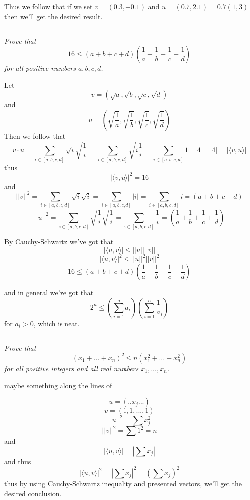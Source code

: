 \documentclass[11pt,oneside,titlepage]{book}
\begin{document}
Thus we follow that if we set $v = (0.3, -0.1)$
and $u = (0.7, 2.1) = 0.7(1, 3)$ then we'll
get the desired result.

\subsection{}

\textit{Prove that }
$$16 \leq (a + b + c + d)(\frac 1 a + \frac 1 b + \frac 1 c + \frac 1 d)$$
\textit{for all positive numbers $a, b, c, d$.}


Let
$$v = (\sqrt{a}, \sqrt{b}, \sqrt{c}, \sqrt{d})$$
and
$$u = \left(\sqrt{\frac 1 a}, \sqrt{\frac 1 b}, \sqrt{\frac 1 c}, \sqrt{\frac 1 d}\right)$$
Then we follow that
$$v \cdot u = \sum_{i \in [a, b, c, d]}{\sqrt{i} \sqrt{\frac{1}{i}}} =
\sum_{i \in [a, b, c, d]}{\sqrt{i \frac{1}{i}}} =
\sum_{i \in [a, b, c, d]}{1} = 4 = |4| = |\langle v,  u \rangle|$$
thus
$$|\langle v,  u \rangle|^2 = 16$$
and
$$||v||^2 = \sum_{i \in [a, b, c, d]}{\sqrt{i}\sqrt{i}} =
\sum_{i \in [a, b, c, d]}{|i|} = \sum_{i \in [a, b, c, d]}{i} = (a + b + c + d)$$
$$||u||^2 = \sum_{i \in [a, b, c, d]}{\sqrt{\frac 1 i}\sqrt{\frac 1 i}} =
\sum_{i \in [a, b, c, d]}{\frac 1 i} = \left(\frac 1 a + \frac 1 b + \frac 1 c + \frac 1 d\right)$$

By Cauchy-Schwartz we've got that
$$|\langle u, v \rangle | \leq ||u||||v||$$
$$|\langle u, v \rangle |^2 \leq ||u||^2||v||^2$$
$$16 \leq (a + b + c + d)\left(\frac 1 a + \frac 1 b + \frac 1 c + \frac 1 d \right)$$

and in general we've got that
$$2^n \leq \left(\sum_{i = 1}^n{a_i} \right)\left(\sum_{i = 1}^n{\frac 1 a_i} \right)$$
for $a_i > 0$, which is neat.

\subsection{}

\textit{Prove that }
$$(x_1 +  ... + x_n)^2 \leq n(x_1^2 + ... + x_n^2)$$
\textit{for all positive integers and all real numbers $x_1, ..., x_n$.}



maybe something along the lines of

$$u = (.. x_j ...) $$
$$v = (1, 1, ..., 1)$$
$$||u||^2 = \sum{x_j^2}$$
$$||v||^2 = \sum{1^2} = n$$
and
$$|\langle u, v \rangle | = |\sum{x_j}|$$
and thus
$$|\langle u, v \rangle |^2 = |\sum{x_j}|^2 = (\sum{x_j})^2$$
thus by using Cauchy-Schwartz inequality and presented vectors, we'll get the desired conclusion.
\end{document}
